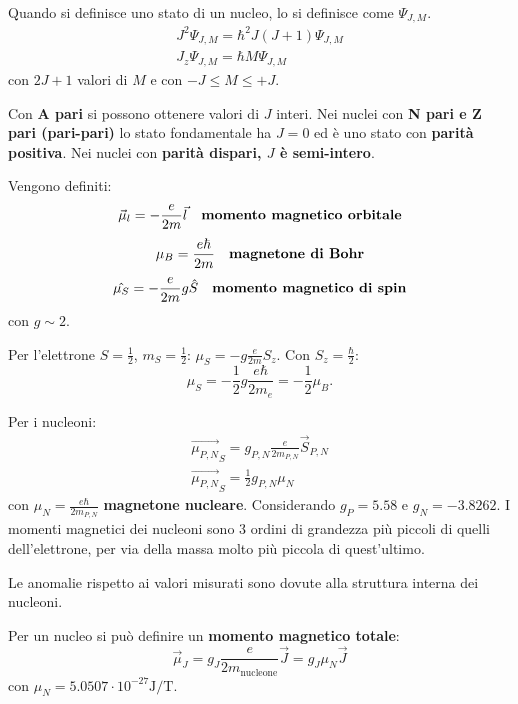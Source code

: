 \documentclass[a4paper,11pt,twoside,openany]{book}
\theoremstyle{definition}
\theoremstyle{plain}
\theoremstyle{plain}
\theoremstyle{definition}
\begin{document}
Quando si definisce uno stato di un nucleo, lo si definisce come $\Psi_{J,M}$.
\begin{equation}\begin{split}
J^2\Psi_{J,M}=\hbar^2J(J+1)\Psi_{J,M}\\
J_z\Psi_{J,M}=\hbar M\Psi_{J,M}
\end{split}\end{equation}
con $2J+1$ valori di $M$ e con $-J\le M\le+J$.

Con \textbf{A pari} si possono ottenere valori di $J$ interi. Nei nuclei con \textbf{N pari e Z pari (pari-pari)} lo stato fondamentale ha $J=0$ ed è uno stato con \textbf{parità positiva}. Nei nuclei con \textbf{parità dispari, $J$ è semi-intero}.

Vengono definiti:
\begin{equation}
\vec \mu_l=-\frac{e}{2m}\vec l \quad \textrm{\textbf{momento magnetico orbitale}}
\end{equation}
\begin{equation}
\mu_B=\frac{e\hbar}{2m} \quad \textrm{\textbf{magnetone di Bohr}}
\end{equation}
\begin{equation}
\hat{\mu_S}=-\frac{e}{2m}g\hat S \quad \textrm{\textbf{momento magnetico di spin}}
\end{equation}
con $g\sim 2$.

Per l'elettrone $S=\frac{1}{2}$, $m_S=\frac{1}{2}$: $\mu_S=-g\frac{e}{2m}S_z$. Con $S_z=\frac{\hbar}{2}$:
\begin{equation}
\mu_S=-\frac{1}{2}g\frac{e\hbar}{2m_e}=-\frac{1}{2}\mu_B.
\end{equation}

Per i nucleoni:
\begin{equation}
\begin{split}
\vec{\mu_{P,N}}_S=g_{P,N}\frac{e}{2m_{P,N}}\vec S_{P,N}\\
\vec{\mu_{P,N}}_S=\frac{1}{2}g_{P,N}\mu_N
\end{split}
\end{equation}
con $\mu_N=\frac{e\hbar}{2m_{P,N}}$ \textbf{magnetone nucleare}. Considerando $g_P=5.58$ e $g_N=-3.8262$. I momenti magnetici dei nucleoni sono 3 ordini di grandezza più piccoli di quelli dell'elettrone, per via della massa molto più piccola di quest'ultimo.

Le anomalie rispetto ai valori misurati sono dovute alla struttura interna dei nucleoni.

Per un nucleo si può definire un \textbf{momento magnetico totale}:
\begin{equation}
\vec \mu_J=g_J\frac{e}{2m_{\textrm{nucleone}}}\vec J=g_J\mu_N\vec J
\end{equation}
con $\mu_N= 5.0507 \cdot 10^{-27} \si{\joule\per\tesla}$.
\end{document}
